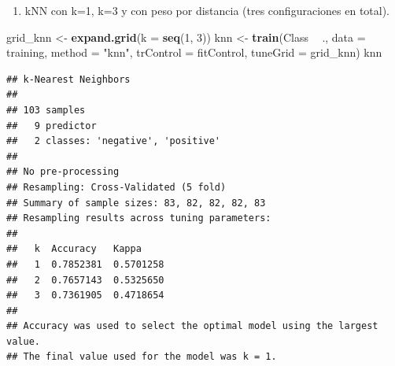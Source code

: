 \documentclass[]{article}
\newenvironment{Shaded}{\begin{snugshade}}{\end{snugshade}}
\newcommand{\DataTypeTok}[1]{\textcolor[rgb]{0.13,0.29,0.53}{#1}}
\newcommand{\DecValTok}[1]{\textcolor[rgb]{0.00,0.00,0.81}{#1}}
\newcommand{\KeywordTok}[1]{\textcolor[rgb]{0.13,0.29,0.53}{\textbf{#1}}}
\newcommand{\NormalTok}[1]{#1}
\newcommand{\OperatorTok}[1]{\textcolor[rgb]{0.81,0.36,0.00}{\textbf{#1}}}
\newcommand{\StringTok}[1]{\textcolor[rgb]{0.31,0.60,0.02}{#1}}
\providecommand{\tightlist}{%
  \setlength{\itemsep}{0pt}\setlength{\parskip}{0pt}}
\begin{document}
\begin{enumerate}
\def\labelenumi{\arabic{enumi}.}
\setcounter{enumi}{1}
\tightlist
\item
  kNN con k=1, k=3 y con peso por distancia (tres configuraciones en
  total).
\end{enumerate}

\begin{Shaded}
\begin{Highlighting}[]
\NormalTok{grid_knn <-}\StringTok{ }\KeywordTok{expand.grid}\NormalTok{(}\DataTypeTok{k =} \KeywordTok{seq}\NormalTok{(}\DecValTok{1}\NormalTok{, }\DecValTok{3}\NormalTok{))}
\NormalTok{knn <-}\StringTok{ }\KeywordTok{train}\NormalTok{(Class }\OperatorTok{~}\StringTok{ }\NormalTok{., }\DataTypeTok{data =}\NormalTok{ training, }\DataTypeTok{method =} \StringTok{"knn"}\NormalTok{, }\DataTypeTok{trControl =}\NormalTok{ fitControl, }\DataTypeTok{tuneGrid =}\NormalTok{ grid_knn)}
\NormalTok{knn}
\end{Highlighting}
\end{Shaded}

\begin{verbatim}
## k-Nearest Neighbors 
## 
## 103 samples
##   9 predictor
##   2 classes: 'negative', 'positive' 
## 
## No pre-processing
## Resampling: Cross-Validated (5 fold) 
## Summary of sample sizes: 83, 82, 82, 82, 83 
## Resampling results across tuning parameters:
## 
##   k  Accuracy   Kappa    
##   1  0.7852381  0.5701258
##   2  0.7657143  0.5325650
##   3  0.7361905  0.4718654
## 
## Accuracy was used to select the optimal model using the largest value.
## The final value used for the model was k = 1.
\end{verbatim}

\begin{Shaded}
\end{Shaded}
\end{document}
